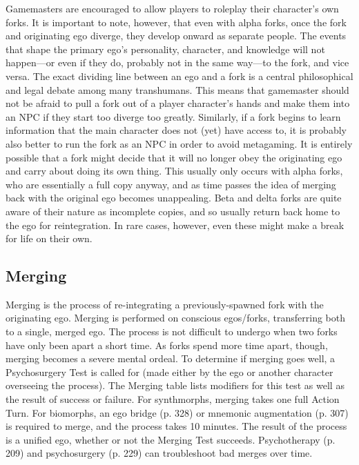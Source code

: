 Gamemasters are encouraged to allow players to roleplay
their character's own forks. It is important to
note, however, that even with alpha forks, once the 
fork and originating ego diverge, they develop onward 
as separate people. The events that shape the primary 
ego's personality, character, and knowledge will not 
happen—or even if they do, probably not in the same 
way—to the fork, and vice versa. The exact dividing 
line between an ego and a fork is a central philosophical
and legal debate among many transhumans.
This means that gamemaster should not be afraid 
to pull a fork out of a player character's hands and 
make them into an NPC if they start too diverge too 
greatly. Similarly, if a fork begins to learn information 
that the main character does not (yet) have access to, 
it is probably also better to run the fork as an NPC in 
order to avoid metagaming.
It is entirely possible that a fork might decide that 
it will no longer obey the originating ego and carry 
about doing its own thing. This usually only occurs 
with alpha forks, who are essentially a full copy 
anyway, and as time passes the idea of merging back 
with the original ego becomes unappealing. Beta and 
delta forks are quite aware of their nature as incomplete
copies, and so usually return back home to the
ego for reintegration. In rare cases, however, even 
these might make a break for life on their own.

\subsection{Merging}

Merging is the process of re-integrating a previously-spawned
fork with the originating ego. Merging is
performed on conscious egos/forks, transferring both 
to a single, merged ego. The process is not difficult 
to undergo when two forks have only been apart a 
short time. As forks spend more time apart, though, 
merging becomes a severe mental ordeal.
To determine if merging goes well, a Psychosurgery 
Test is called for (made either by the ego or another 
character overseeing the process). The Merging table 
lists modifiers for this test as well as the result of success
or failure.
For synthmorphs, merging takes one full Action 
Turn. For biomorphs, an ego bridge (p. 328) or mnemonic
augmentation (p. 307) is required to merge,
and the process takes 10 minutes.
The result of the process is a unified ego, whether 
or not the Merging Test succeeds. Psychotherapy (p. 
209) and psychosurgery (p. 229) can troubleshoot bad 
merges over time.

